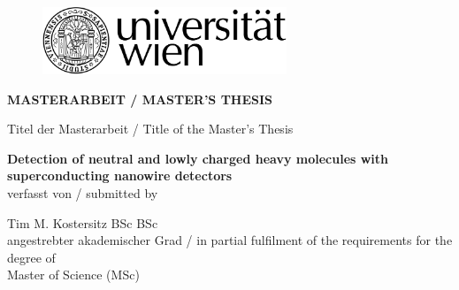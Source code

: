 ﻿\begin{titlepage}

\begin{center}
\begin{figure}
\hspace{9.1cm}
\includegraphics[width=7.31cm]{figures/uni_logo.png}
\end{figure}
\vspace*{2.1cm}

\fontsize{22}{0} \selectfont \textbf{ MASTERARBEIT / MASTER'S THESIS}\\
\vspace*{2.5cm}

\fontsize{11}{0} \selectfont Titel der Masterarbeit / Title of the Master's Thesis\\
\vspace*{0.4cm}

\fontsize{18}{0} \selectfont \textbf{\glqq Detection of neutral and lowly charged heavy molecules with superconducting nanowire detectors \grqq}\\

\vspace*{2.8cm}
{\fontsize{11}{0} \selectfont verfasst von / submitted by}\\
\vspace*{0.4cm}

{ \fontsize{14}{0} \selectfont Tim M. Kostersitz BSc BSc\\}
\vspace*{1.6cm}
{ \fontsize{11}{0} \selectfont angestrebter akademischer Grad / in partial fulfilment of the requirements for the degree of}\\
\vspace*{0.4cm}
{ \fontsize{14}{0} \selectfont  Master of Science (MSc)}
\vspace*{2.4cm}


\end{center}
\end{titlepage}

